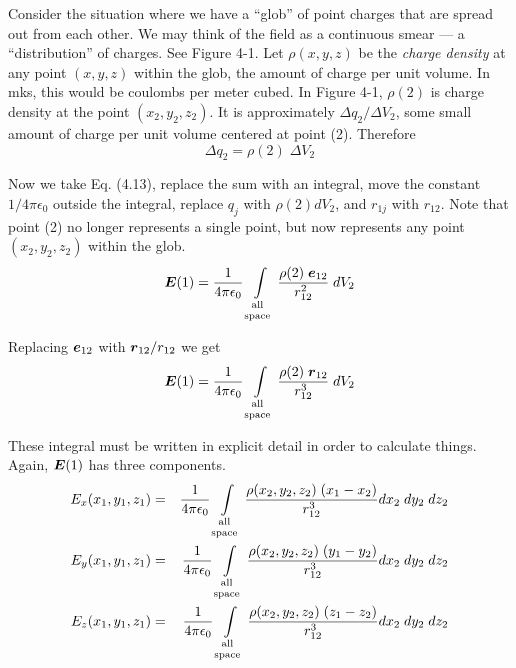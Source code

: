 Consider the situation where we have a ``glob'' of point charges that are 
spread out from each other.  We may think of the field as a continuous smear --- 
a ``distribution'' of charges.  See Figure 4-1.
Let $\rho (x,y,z)$ be the \emph{charge density} at any point $(x,y,z)$
within the glob, the amount of charge per unit volume.
In mks, this would be coulombs per meter cubed.
In Figure 4-1, $\rho (2)$ is charge density at the point $(x_2,y_2,z_2)$.
It is approximately $\Delta q_2 / \Delta V_2$, some small amount of charge
per unit volume centered at point (2).  Therefore
\begin{equation}
  \Delta q_2 = \rho (2) \; \Delta V_2
\end{equation}

Now we take Eq. (4.13), replace the sum with an integral, 
move the constant $1 / 4 \pi \epsilon_0$ outside the integral,
replace $q_j$ with $\rho(2) dV_2$, and $r_{1j}$ with $r_{12}$.
Note that point (2) no longer represents a single point, but
now represents any point $(x_2,y_2,z_2)$ within the glob.
\begin{equation}
  \bv{E}(1) = \frac{1}{4\pi\epsilon_0}
  \int\limits_{\genfrac{}{}{0pt}{1}{\mathrm{all}}{\mathrm{space}}}
  \frac{\rho(2) \; \bv{e}_{12}}{r^2_{12}} \; dV_2
\end{equation}

Replacing $\boldsymbol{e}_{12}$ with $\boldsymbol{r}_{12} / r_{12}$ we get
\begin{equation}
  \bv{E}(1) = \frac{1}{4\pi\epsilon_0}
  \int\limits_{\genfrac{}{}{0pt}{1}{\mathrm{all}}{\mathrm{space}}}
  \frac{\rho(2) \; \bv{r}_{12}}{r^3_{12}} \; dV_2
\end{equation}

These integral must be written in explicit detail in order to calculate things.
Again, $\boldsymbol{E}(1)$ has three components.
\begin{eqnarray}
  E_x (x_1,y_1,z_1) &=& \frac{1}{4\pi\epsilon_0}
  \int\limits_{\genfrac{}{}{0pt}{1}{\mathrm{all}}{\mathrm{space}}}
  \frac{\rho(x_2,y_2,z_2) \; (x_1 - x_2)}{r_{12}^3} dx_2 \; dy_2 \; dz_2 \\
  E_y (x_1,y_1,z_1) &=& \frac{1}{4\pi\epsilon_0}
  \int\limits_{\genfrac{}{}{0pt}{1}{\mathrm{all}}{\mathrm{space}}}
  \frac{\rho(x_2,y_2,z_2) \; (y_1 - y_2)}{r_{12}^3} dx_2 \; dy_2 \; dz_2 \nonumber\\
  E_z (x_1,y_1,z_1) &=& \frac{1}{4\pi\epsilon_0}
  \int\limits_{\genfrac{}{}{0pt}{1}{\mathrm{all}}{\mathrm{space}}}
  \frac{\rho(x_2,y_2,z_2) \; (z_1 - z_2)}{r_{12}^3} dx_2 \; dy_2 \; dz_2 \nonumber
\end{eqnarray}

